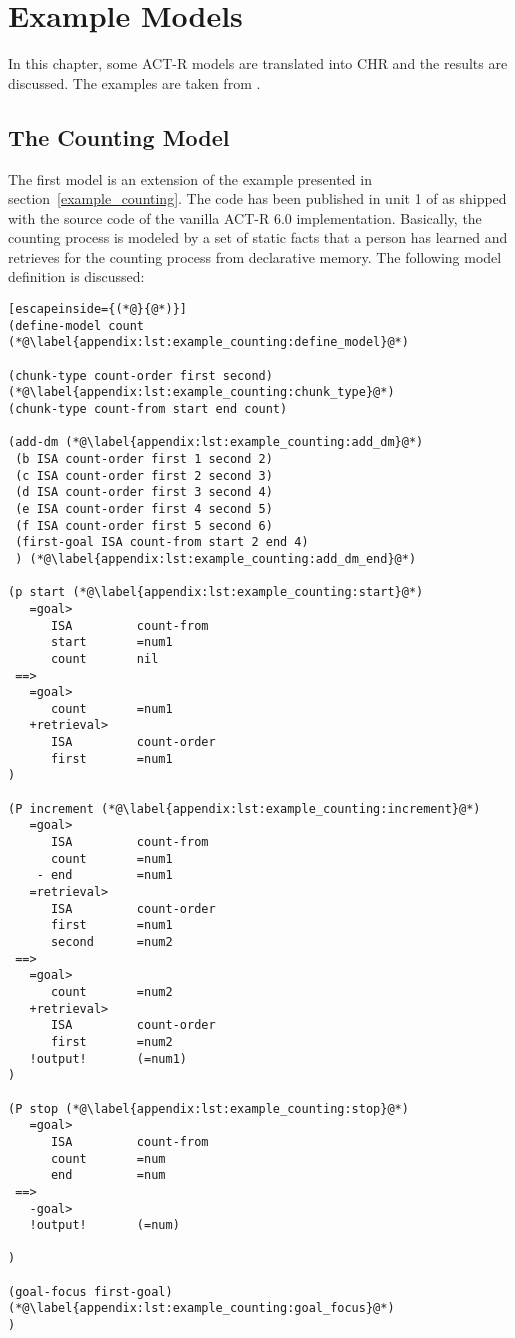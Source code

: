 \chapter{Example Models}

In this chapter, some ACT-R models are translated into CHR and the results are discussed. The examples are taken from  \cite{actr_tutorial}.

\section{The Counting Model}

The first model is an extension of the example presented in section~\ref{example_counting}. The code has been published in unit 1 of  \cite{actr_tutorial} as shipped with the source code of the vanilla ACT-R 6.0 implementation. Basically, the counting process is modeled by a set of static facts that a person has learned and retrieves for the counting process from declarative memory. The following model definition is discussed:

\begin{lstlisting}[escapeinside={(*@}{@*)}]
(define-model count (*@\label{appendix:lst:example_counting:define_model}@*)

(chunk-type count-order first second) (*@\label{appendix:lst:example_counting:chunk_type}@*)
(chunk-type count-from start end count)

(add-dm (*@\label{appendix:lst:example_counting:add_dm}@*)
 (b ISA count-order first 1 second 2)
 (c ISA count-order first 2 second 3)
 (d ISA count-order first 3 second 4)
 (e ISA count-order first 4 second 5)
 (f ISA count-order first 5 second 6)
 (first-goal ISA count-from start 2 end 4)
 ) (*@\label{appendix:lst:example_counting:add_dm_end}@*)

(p start (*@\label{appendix:lst:example_counting:start}@*)
   =goal>
      ISA         count-from
      start       =num1
      count       nil
 ==>
   =goal>
      count       =num1
   +retrieval>
      ISA         count-order
      first       =num1
)

(P increment (*@\label{appendix:lst:example_counting:increment}@*)
   =goal>
      ISA         count-from
      count       =num1
    - end         =num1
   =retrieval>
      ISA         count-order
      first       =num1
      second      =num2
 ==>
   =goal>
      count       =num2
   +retrieval>
      ISA         count-order
      first       =num2
   !output!       (=num1)
)

(P stop (*@\label{appendix:lst:example_counting:stop}@*)
   =goal>
      ISA         count-from
      count       =num
      end         =num
 ==>
   -goal>
   !output!       (=num)

)

(goal-focus first-goal) (*@\label{appendix:lst:example_counting:goal_focus}@*)
)
\end{lstlisting}

